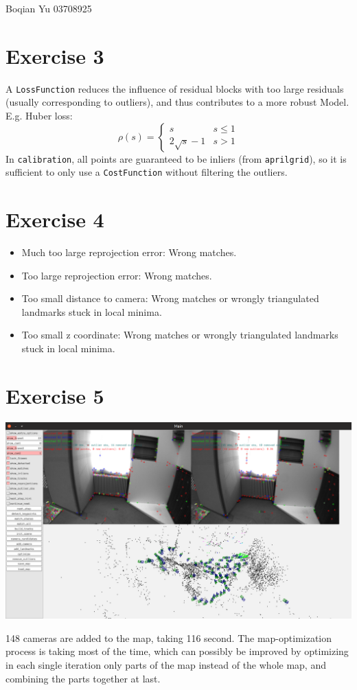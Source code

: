 \documentclass[a4paper, 12pt]{article}
\begin{document}
    Boqian Yu 03708925
	\section{Exercise 3}
        A \texttt{LossFunction} reduces the influence of residual blocks with too large residuals (usually corresponding to outliers), and thus contributes to a more robust Model. E.g. Huber loss:
        \begin{equation*}
        \rho(s)=\left\{\begin{array}{ll}{s} & {s \leq 1} \\ {2 \sqrt{s}-1} & {s>1}\end{array}\right.
        \end{equation*}
        In \texttt{calibration}, all points are guaranteed to be inliers (from \texttt{aprilgrid}), so it is sufficient to only use a \texttt{CostFunction} without filtering the outliers.
        
    \section{Exercise 4}
    \begin{itemize}
        \item Much too large reprojection error: Wrong matches.
        \item Too large reprojection error: Wrong matches.
        \item Too small distance to camera: Wrong matches or wrongly triangulated landmarks stuck in local minima.
        \item Too small z coordinate: Wrong matches or wrongly triangulated landmarks stuck in local minima.
    \end{itemize}
    
    \section{Exercise 5}
        \centering
        \includegraphics[width=0.9\linewidth]{ex4.png}
        
        \raggedright
        148 cameras are added to the map, taking 116 second. The map-optimization process is taking most of the time, which can possibly be improved by optimizing in each single iteration only parts of the map instead of the whole map, and combining the parts together at last.
\end{document}

